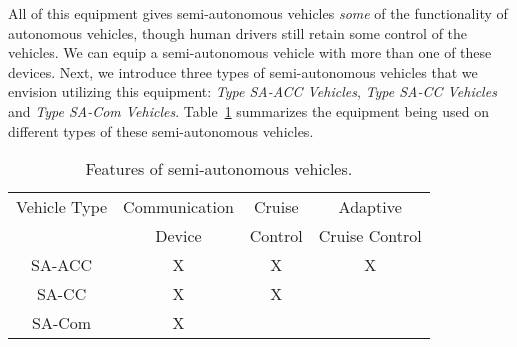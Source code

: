 All of this equipment gives semi-autonomous vehicles \emph{some} of
the functionality of autonomous vehicles, though human drivers still
retain some control of the vehicles.  We can equip a semi-autonomous
vehicle with more than one of these devices.  Next, we introduce three
types of semi-autonomous vehicles that we envision utilizing this
equipment: \textit{Type SA-ACC Vehicles}, \textit{Type SA-CC Vehicles}
and \textit{Type SA-Com Vehicles}.
Table~\ref{table:type} summarizes the equipment being used on
different types of these semi-autonomous vehicles.


\begin{table}
\centering
\caption{Features of semi-autonomous vehicles.}
\label{table:type}
\small
\begin{tabular}{|c|c|c|c|}
  \hline
  Vehicle Type & Communication & Cruise & Adaptive \\
               & Device & Control & Cruise Control \\
  \hline
  SA-ACC & X & X & X  \\
  \hline
  SA-CC & X & X &  \\
  \hline
  SA-Com & X & &  \\
  \hline
\end{tabular}
\vspace{-.25in}
\end{table}

